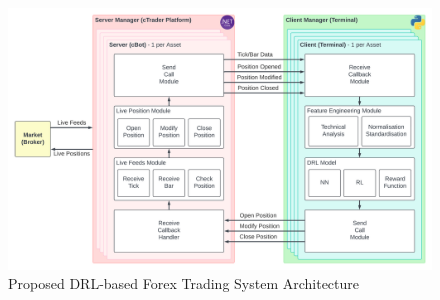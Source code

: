 \begin{figure}[htb!]
    \centering
    \includegraphics[width=\textwidth]{Images/SystemArchitecture.png}
    \caption{Proposed DRL-based Forex Trading System Architecture}
    \label{Figure:SystemArchitecture}
\end{figure}

